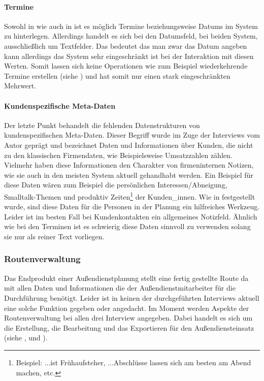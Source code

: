 \documentclass[Bachelorarbeit.tex]{subfiles}
\begin{document}
\paragraph{Termine}
Sowohl in  wie auch in  ist es möglich Termine beziehungsweise Datums im System zu hinterlegen. 
Allerdings handelt es sich bei den Datumsfeld, bei beiden System, ausschließlich um Textfelder. 
Das bedeutet das man zwar das Datum angeben kann allerdings das System sehr eingeschränkt ist bei der Interaktion mit diesen Werten. 
Somit lassen sich keine Operationen wie zum Beispiel wiederkehrende Termine erstellen (siehe ) und hat somit nur einen stark eingeschränkten Mehrwert.


\paragraph{Kundenspezifische Meta-Daten}
Der letzte Punkt behandelt die fehlenden Datenstrukturen von kundenspezifischen Meta-Daten.
Dieser Begriff wurde im Zuge der Interviews vom Autor geprägt und bezeichnet Daten und Informationen über Kunden, die nicht zu den klassischen Firmendaten, wie Beispielsweise Umsatzzahlen zählen. 
Vielmehr haben diese Informationen den Charakter von firmeninternen Notizen, wie sie auch in den meisten System aktuell gehandhabt werden.
Ein Beispiel für diese Daten wären zum Beispiel die persönlichen Interessen/Abneigung, Smalltalk-Themen und produktiv Zeiten\footnote{Beispiel: ...ist Frühaufsteher, ...Abschlüsse lassen sich am besten am Abend machen, etc.} der Kunden\_innen. 
Wie in   festgestellt wurde, sind diese Daten für die Personen in der Planung ein hilfreiches Werkzeug. 
Leider ist im besten Fall bei Kundenkontakten ein allgemeines Notizfeld. 
Ähnlich wie bei den Terminen ist es schwierig diese Daten sinnvoll zu verwenden solang sie nur als reiner Text vorliegen.

\subsubsection*{Routenverwaltung}
\label{interviewsAnalyseRoutenverwaltung}
Das Endprodukt einer Außendienstplanung stellt eine fertig gestellte Route da mit allen Daten und Informationen die der Außendienstmitarbeiter für die Durchführung benötigt.
Leider ist in keinen der durchgeführten Interviews aktuell eine solche Funktion gegeben oder angedacht.
Im Moment werden Aspekte der Routenverwaltung bei allen drei Interview angegeben.
Dabei handelt es sich um die Erstellung, die Bearbeitung und das Exportieren für den Außendiensteinsatz (siehe ,  und ). 
\end{document}
